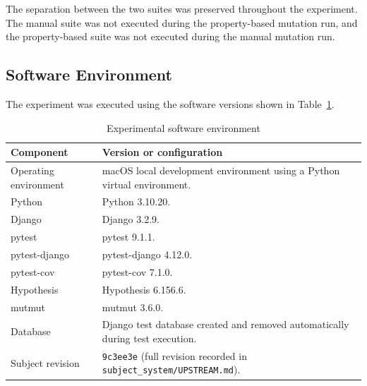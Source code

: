 \documentclass[12pt]{article}
\begin{document}
The separation between the two suites was preserved throughout the experiment.
The manual suite was not executed during the property-based mutation run, and
the property-based suite was not executed during the manual mutation run.

\subsection{Software Environment}

The experiment was executed using the software versions shown in
Table~\ref{tab:software-environment}.

\begin{table}[H]
\centering
\caption{Experimental software environment}
\label{tab:software-environment}

\begin{tabular}{|p{5.2cm}|p{8.3cm}|}
\hline
\textbf{Component} & \textbf{Version or configuration} \\
\hline

Operating environment &
macOS local development environment using a Python virtual environment. \\
\hline

Python &
Python 3.10.20. \\
\hline

Django &
Django 3.2.9. \\
\hline

pytest &
pytest 9.1.1. \\
\hline

pytest-django &
pytest-django 4.12.0. \\
\hline

pytest-cov &
pytest-cov 7.1.0. \\
\hline

Hypothesis &
Hypothesis 6.156.6. \\
\hline

mutmut &
mutmut 3.6.0. \\
\hline

Database &
Django test database created and removed automatically during test execution. \\
\hline

Subject revision &
\texttt{9c3ee3e} (full revision recorded in
\texttt{subject\_system/UPSTREAM.md}). \\
\hline

\end{tabular}
\end{table}
\end{document}
